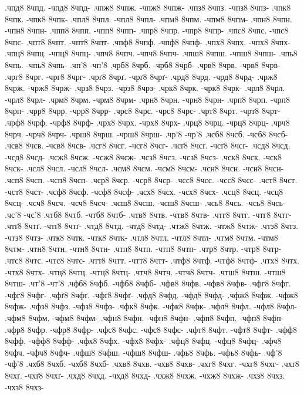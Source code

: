 {.чпд8 8чпд. -чпд8 8чпд-
.чпж8 8чпж. -чпж8 8чпж-
.чпз8 8чпз. -чпз8 8чпз-
.чпк8 8чпк. -чпк8 8чпк-
.чпл8 8чпл. -чпл8 8чпл-
.чпм8 8чпм. -чпм8 8чпм-
.чпн8 8чпн. -чпн8 8чпн-
.чпп8 8чпп. -чпп8 8чпп-
.чпр8 8чпр. -чпр8 8чпр-
.чпс8 8чпс. -чпс8 8чпс-
.чпт8 8чпт. -чпт8 8чпт-
.чпф8 8чпф. -чпф8 8чпф-
.чпх8 8чпх. -чпх8 8чпх-
.чпц8 8чпц. -чпц8 8чпц-
.чпч8 8чпч. -чпч8 8чпч-
.чпш8 8чпш. -чпш8 8чпш-
.чпь8 8чпь. -чпь8 8чпь-
.чп'8 -чп'8
.чрб8 8чрб. -чрб8 8чрб-
.чрв8 8чрв. -чрв8 8чрв-
.чрг8 8чрг. -чрг8 8чрг-
.чрґ8 8чрґ. -чрґ8 8чрґ-
.чрд8 8чрд. -чрд8 8чрд-
.чрж8 8чрж. -чрж8 8чрж-
.чрз8 8чрз. -чрз8 8чрз-
.чрк8 8чрк. -чрк8 8чрк-
.чрл8 8чрл. -чрл8 8чрл-
.чрм8 8чрм. -чрм8 8чрм-
.чрн8 8чрн. -чрн8 8чрн-
.чрп8 8чрп. -чрп8 8чрп-
.чрр8 8чрр. -чрр8 8чрр-
.чрс8 8чрс. -чрс8 8чрс-
.чрт8 8чрт. -чрт8 8чрт-
.чрф8 8чрф. -чрф8 8чрф-
.чрх8 8чрх. -чрх8 8чрх-
.чрц8 8чрц. -чрц8 8чрц-
.чрч8 8чрч. -чрч8 8чрч-
.чрш8 8чрш. -чрш8 8чрш-
.чр'8 -чр'8
.чсб8 8чсб. -чсб8 8чсб-
.чсв8 8чсв. -чсв8 8чсв-
.чсг8 8чсг. -чсг8 8чсг-
.чсґ8 8чсґ. -чсґ8 8чсґ-
.чсд8 8чсд. -чсд8 8чсд-
.чсж8 8чсж. -чсж8 8чсж-
.чсз8 8чсз. -чсз8 8чсз-
.чск8 8чск. -чск8 8чск-
.чсл8 8чсл. -чсл8 8чсл-
.чсм8 8чсм. -чсм8 8чсм-
.чсн8 8чсн. -чсн8 8чсн-
.чсп8 8чсп. -чсп8 8чсп-
.чср8 8чср. -чср8 8чср-
.чсс8 8чсс. -чсс8 8чсс-
.чст8 8чст. -чст8 8чст-
.чсф8 8чсф. -чсф8 8чсф-
.чсх8 8чсх. -чсх8 8чсх-
.чсц8 8чсц. -чсц8 8чсц-
.чсч8 8чсч. -чсч8 8чсч-
.чсш8 8чсш. -чсш8 8чсш-
.чсь8 8чсь. -чсь8 8чсь-
.чс'8 -чс'8
.чтб8 8чтб. -чтб8 8чтб-
.чтв8 8чтв. -чтв8 8чтв-
.чтг8 8чтг. -чтг8 8чтг-
.чтґ8 8чтґ. -чтґ8 8чтґ-
.чтд8 8чтд. -чтд8 8чтд-
.чтж8 8чтж. -чтж8 8чтж-
.чтз8 8чтз. -чтз8 8чтз-
.чтк8 8чтк. -чтк8 8чтк-
.чтл8 8чтл. -чтл8 8чтл-
.чтм8 8чтм. -чтм8 8чтм-
.чтн8 8чтн. -чтн8 8чтн-
.чтп8 8чтп. -чтп8 8чтп-
.чтр8 8чтр. -чтр8 8чтр-
.чтс8 8чтс. -чтс8 8чтс-
.чтт8 8чтт. -чтт8 8чтт-
.чтф8 8чтф. -чтф8 8чтф-
.чтх8 8чтх. -чтх8 8чтх-
.чтц8 8чтц. -чтц8 8чтц-
.чтч8 8чтч. -чтч8 8чтч-
.чтш8 8чтш. -чтш8 8чтш-
.чт'8 -чт'8
.чфб8 8чфб. -чфб8 8чфб-
.чфв8 8чфв. -чфв8 8чфв-
.чфг8 8чфг. -чфг8 8чфг-
.чфґ8 8чфґ. -чфґ8 8чфґ-
.чфд8 8чфд. -чфд8 8чфд-
.чфж8 8чфж. -чфж8 8чфж-
.чфз8 8чфз. -чфз8 8чфз-
.чфк8 8чфк. -чфк8 8чфк-
.чфл8 8чфл. -чфл8 8чфл-
.чфм8 8чфм. -чфм8 8чфм-
.чфн8 8чфн. -чфн8 8чфн-
.чфп8 8чфп. -чфп8 8чфп-
.чфр8 8чфр. -чфр8 8чфр-
.чфс8 8чфс. -чфс8 8чфс-
.чфт8 8чфт. -чфт8 8чфт-
.чфф8 8чфф. -чфф8 8чфф-
.чфх8 8чфх. -чфх8 8чфх-
.чфц8 8чфц. -чфц8 8чфц-
.чфч8 8чфч. -чфч8 8чфч-
.чфш8 8чфш. -чфш8 8чфш-
.чфь8 8чфь. -чфь8 8чфь-
.чф'8 -чф'8
.чхб8 8чхб. -чхб8 8чхб-
.чхв8 8чхв. -чхв8 8чхв-
.чхг8 8чхг. -чхг8 8чхг-
.чхґ8 8чхґ. -чхґ8 8чхґ-
.чхд8 8чхд. -чхд8 8чхд-
.чхж8 8чхж. -чхж8 8чхж-
.чхз8 8чхз. -чхз8 8чхз-
}
